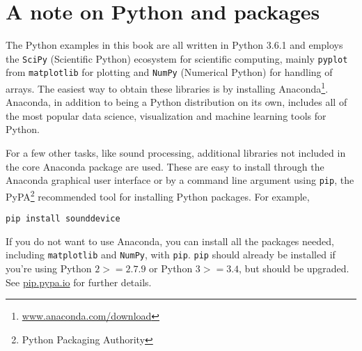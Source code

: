 \documentclass{article}
\begin{document}
\section*{A note on Python and packages}

The Python examples in this book are all written in Python 3.6.1 and employs the \lstinline|SciPy| (Scientific Python) ecosystem for scientific computing, mainly \lstinline|pyplot| from \lstinline|matplotlib| for plotting and \lstinline|NumPy| (Numerical Python) for handling of arrays. The easiest way to obtain these libraries is by installing Anaconda\footnote{\url{www.anaconda.com/download}}. Anaconda, in addition to being a Python distribution on its own, includes all of the most popular data science, visualization and machine learning tools for Python.

For a few other tasks, like sound processing, additional libraries not included in the core Anaconda package are used. These are easy to install through the Anaconda graphical user interface or by a command line argument using \lstinline|pip|, the PyPA\footnote{Python Packaging Authority} recommended tool for installing Python packages. For example,

\begin{lstlisting}
pip install sounddevice
\end{lstlisting}

If you do not want to use Anaconda, you can install all the packages needed, including \lstinline|matplotlib| and \lstinline|NumPy|, with  \lstinline|pip|. \lstinline|pip| should already be installed if you're using Python $2>=2.7.9$ or Python $3>=3.4$, but should be upgraded. See \url{pip.pypa.io} for further details.
\end{document}
